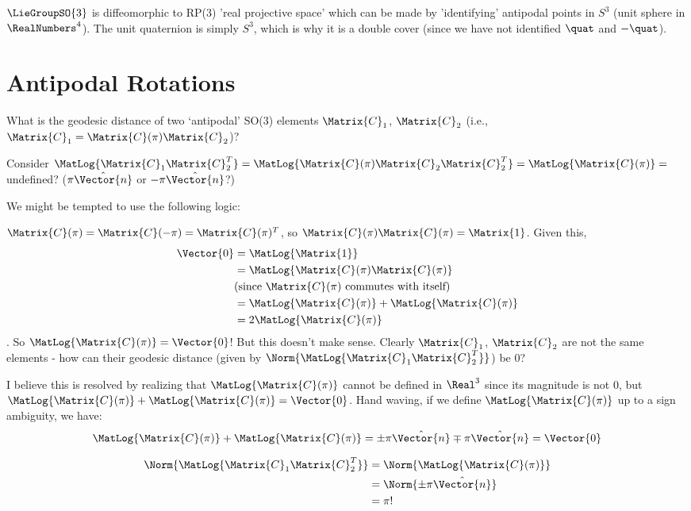  $\LieGroupSO{3}$ is diffeomorphic to RP(3) 'real projective space' which can be made by 'identifying' antipodal points in $S^3$ (unit sphere in $\RealNumbers^4$). The unit quaternion is simply $S^3$, which is why it is a double cover (since we have not identified $\quat$ and $-\quat$).


\section{Antipodal Rotations}

What is the geodesic distance of two ‘antipodal’ SO(3) elements $\Matrix{C}_1$, $\Matrix{C}_2$ (i.e., $\Matrix{C}_1 = \Matrix{C}(\pi)\Matrix{C}_2$)? 

Consider $\MatLog{\Matrix{C}_1\Matrix{C}_2^T} = \MatLog{\Matrix{C}(\pi)\Matrix{C}_2\Matrix{C}_2^T} = \MatLog{\Matrix{C}(\pi)} =$ undefined? ($\pi \hat{\Vector{n}}$ or $-\pi\hat{\Vector{n}}$?)

We might be tempted to use the following logic:

$\Matrix{C}(\pi) = \Matrix{C}(-\pi) = \Matrix{C}(\pi)^T$, so $\Matrix{C}(\pi)\Matrix{C}(\pi) = \Matrix{1}$. 
Given this, 
\begin{align}
\Vector{0} &= \MatLog{\Matrix{1}} \\
&= \MatLog{\Matrix{C}(\pi)\Matrix{C}(\pi)} \\
&(\text{since}  ~\Matrix{C}(\pi)~ \text{commutes with itself}) \\
&= \MatLog{\Matrix{C}(\pi)} + \MatLog{\Matrix{C}(\pi)} \\  &= 2 \MatLog{\Matrix{C}(\pi)}
\end{align}. 
So $\MatLog{\Matrix{C}(\pi)} = \Vector{0}$! But this doesn't make sense. Clearly $\Matrix{C}_1$, $\Matrix{C}_2$ are not the same elements - how can their geodesic distance (given by $\Norm{\MatLog{\Matrix{C}_1\Matrix{C}_2^T}}$) be 0?

I believe this is resolved by realizing that $\MatLog{\Matrix{C}(\pi)}$ cannot be defined in $\Real^3$ since its magnitude is not 0, but  $\MatLog{\Matrix{C}(\pi)} + \MatLog{\Matrix{C}(\pi)} = \Vector{0}$. Hand waving, if we define $\MatLog{\Matrix{C}(\pi)}$ up to a sign ambiguity, we have:
\begin{align}
\MatLog{\Matrix{C}(\pi)} + \MatLog{\Matrix{C}(\pi)} = \pm \pi \hat{\Vector{n}} \mp \pi\hat{\Vector{n}} = \Vector{0}
\end{align}

\begin{align}
\Norm{\MatLog{\Matrix{C}_1\Matrix{C}_2^T}} &=\Norm{\MatLog{\Matrix{C}(\pi)}} \\
&=\Norm{\pm \pi \hat{\Vector{n}}} \\ 
&= \pi!
\end{align}

